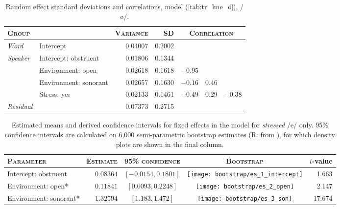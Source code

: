 \begin{table}[H]
  \centering
  \begin{tabular}{llrrrrr}
    \toprule
    \textsc{Group} & \textsc{} & \textsc{Variance} & \textsc{SD} & \multicolumn{3}{c}{\textsc{Correlation}}\\
    \midrule
    \multirow{1}{*}{\textit{Word}} & Intercept & 0.04007 & 0.2002 & & &  \\
    \midrule
    \multirow{4}{*}{\textit{Speaker}} & Intercept: obstruent & 0.01806 &  0.1344  \\
                & Environment: open                        & 0.02618 & 0.1618  & $-0.95$   \\
                & Environment: sonorant                    &0.02657 &  0.1630 & $ -0.16$ & 0.46    \\
                & Stress: yes                              & 0.02133 & 0.1461  & $-0.49$ & 0.29 & $-0.38$ \\
    \midrule
    \textit{Residual} & & 0.07373 & 0.2715 \\
    \bottomrule
  \end{tabular}
  \caption[, /e/]{Random effect standard deviations and correlations, model  (\cref{tab:tr_lme_ö}), /ø/.}
  \label{tab:tr_lme_ö_random}
\end{table}

\begin{table}[H]
  \centering
  \begin{tabular}{lrccr}
    \toprule
    \textsc{Parameter} & \textsc{Estimate} & \textsc{95\% confidence} & \textsc{Bootstrap} & $t$-value\\
    \midrule
    Intercept: obstruent & $0.08364$ & $[-0.0154, 0.1801]$ & \texttt{[image: bootstrap/es\_1\_intercept]} & 1.663 \\
    Environment: open* & $0.11841$ & $[0.0093, 0.2248]$ & \texttt{[image: bootstrap/es\_2\_open]} & 2.147\\
    Environment: sonorant* & $1.32594$ & $[1.183, 1.472]$ & \texttt{[image: bootstrap/es\_3\_son]} & 17.674\\
    \bottomrule
  \end{tabular}
  \caption[, /e/]{Estimated means and derived confidence intervals for fixed effects in the model  for \emph{stressed} /e/ only. 95\% confidence intervals are calculated on 6,000 semi-parametric bootstrap estimates (R:  from ), for which density plots are shown in the final column. }
  \label{tab:tr_lme_e_stressed}
\end{table}

